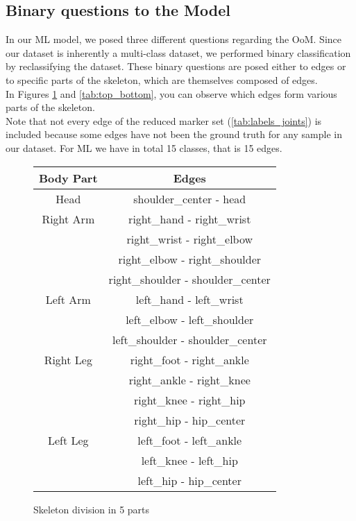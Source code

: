 \subsection{Binary questions to the Model}
In our ML model, we posed three different questions regarding the OoM. 
Since our dataset is inherently a multi-class dataset, we performed binary classification by reclassifying the dataset.
These binary questions are posed either to edges or to specific parts of the skeleton, which are themselves composed of edges. \\
In Figures \ref{tab:body_division_5} and \ref{tab:top_bottom}, you can observe which edges form various parts of the skeleton. \\
Note that not every edge of the reduced marker set (\ref{tab:labels_joints}) is included because some edges have not been the ground truth for any sample in our dataset.
For ML we have in total 15 classes, that is 15 edges.

\begin{figure}[H]
    \centering
    \renewcommand{\arraystretch}{0.85}
    \begin{tabular}{|c|c|}
        \hline
        \textbf{Body Part} & \textbf{Edges} \\
        \hline
        Head & shoulder\_center - head \\
        \hline
        Right Arm & right\_hand - right\_wrist \\
        & right\_wrist - right\_elbow \\
        & right\_elbow - right\_shoulder \\
        & right\_shoulder - shoulder\_center \\
        \hline
        Left Arm & left\_hand - left\_wrist \\
        & left\_elbow - left\_shoulder \\
        & left\_shoulder - shoulder\_center \\
        \hline
        Right Leg & right\_foot - right\_ankle \\
        & right\_ankle - right\_knee \\
        & right\_knee - right\_hip \\
        & right\_hip - hip\_center \\
        \hline
        Left Leg & left\_foot - left\_ankle \\
        & left\_knee - left\_hip \\
        & left\_hip - hip\_center \\
        \hline
    \end{tabular}
    \caption{Skeleton division in 5 parts}
    \label{tab:body_division_5}
\end{figure}    

